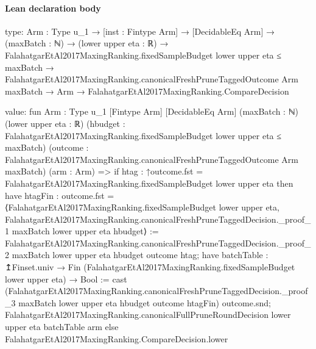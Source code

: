 \documentclass[10pt]{article}
\begin{document}
\paragraph{Lean declaration body}
\begin{ReviewVerbatim}
type:
{Arm : Type u_1} →
  [inst : Fintype Arm] →
    [DecidableEq Arm] →
      (maxBatch : ℕ) →
        (lower upper eta : ℝ) →
          FalahatgarEtAl2017MaxingRanking.fixedSampleBudget lower upper eta ≤ maxBatch →
            FalahatgarEtAl2017MaxingRanking.canonicalFreshPruneTaggedOutcome Arm maxBatch →
              Arm → FalahatgarEtAl2017MaxingRanking.CompareDecision

value:
fun {Arm : Type u_1} [Fintype Arm] [DecidableEq Arm] (maxBatch : ℕ) (lower upper eta : ℝ)
    (hbudget : FalahatgarEtAl2017MaxingRanking.fixedSampleBudget lower upper eta ≤ maxBatch)
    (outcome : FalahatgarEtAl2017MaxingRanking.canonicalFreshPruneTaggedOutcome Arm maxBatch) (arm : Arm) =>
  if htag : ↑outcome.fst = FalahatgarEtAl2017MaxingRanking.fixedSampleBudget lower upper eta then
    have htagFin :
      outcome.fst =
        ⟨FalahatgarEtAl2017MaxingRanking.fixedSampleBudget lower upper eta,
          FalahatgarEtAl2017MaxingRanking.canonicalFreshPruneTaggedDecision._proof_1 maxBatch lower upper eta
            hbudget⟩ :=
      FalahatgarEtAl2017MaxingRanking.canonicalFreshPruneTaggedDecision._proof_2 maxBatch lower upper eta hbudget
        outcome htag;
    have batchTable : ↥Finset.univ → Fin (FalahatgarEtAl2017MaxingRanking.fixedSampleBudget lower upper eta) → Bool :=
      cast
        (FalahatgarEtAl2017MaxingRanking.canonicalFreshPruneTaggedDecision._proof_3 maxBatch lower upper eta hbudget
          outcome htagFin)
        outcome.snd;
    FalahatgarEtAl2017MaxingRanking.canonicalFullPruneRoundDecision lower upper eta batchTable arm
  else FalahatgarEtAl2017MaxingRanking.CompareDecision.lower
\end{ReviewVerbatim}
\end{document}
